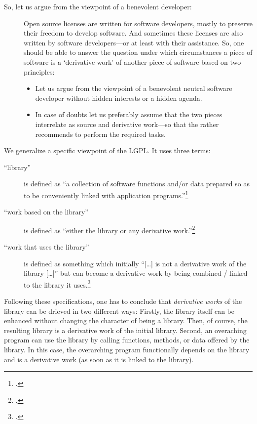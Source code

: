{\begin{description}
  \item[So, let us argue from the viewpoint of a benevolent developer:]\softbreak
    Open source licenses are written for software developers, mostly to preserve
    their freedom to develop software. And sometimes these licenses are also
    written by software developers---or at least with their assistance. So, one
    should be able to answer the question under which circumstances a piece of
    software is a `derivative work' of another piece of software based on two
    principles: 
  \begin{itemize}
    \item Let us argue from the viewpoint of a benevolent neutral software
      developer without hidden interests or a hidden agenda.
    \item In case of doubts let us preferably assume that the two pieces
      interrelate as source and derivative work---so that the \oslic{} rather
      recommends to perform the required tasks.
  \end{itemize}
\end{description}

We generalize a specific viewpoint of the LGPL. It uses three terms:

\begin{description}
  \item[\enquote{library}] is defined as \enquote{a collection of software
  functions and/or data prepared so as to be conveniently linked with
  application programs.}\footcite[cf.][\nopage wp §0]{Lgpl21OsiLicense1999a}
  \item[\enquote{work based on the library}] is defined as \enquote{either the
  library or any derivative work.}\footcite[cf.][\nopage wp
  §0]{Lgpl21OsiLicense1999a}
  \item[\enquote{work that uses the library}] is defined as something which
  initially \enquote{[\ldots] is not a derivative work of the library [\ldots]}
  but can become a derivative work by being combined / linked to the library it
  uses.\footcite[cf.][\nopage wp §5]{Lgpl21OsiLicense1999a}
\end{description}

Following these specifications, one has to conclude that 
\emph{derivative works} of the library can be drieved in two different ways: 
Firstly, the library itself can be enhanced without changing the character of 
being a library. Then, of course, the resulting library is a derivative work 
of the initial library.  Second, an overaching program can use the library by 
calling functions, methods, or data offered by the library. In this case, the 
overarching program functionally depends on the library and is a derivative work 
(as soon as it is linked to the library).

}
